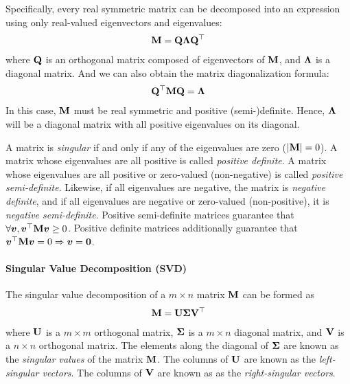 Specifically, every real symmetric matrix can be decomposed into an expression using only real-valued eigenvectors and eigenvalues:
\begin{align*}
	\mathbf{M}=\mathbf{Q}\mathbf{\Lambda}\mathbf{Q}{}^\top
\end{align*}
where $\mathbf{Q}$ is an orthogonal matrix composed of eigenvectors of $\mathbf{M}$, and $\mathbf{\Lambda}$ is a diagonal matrix. And we can also obtain the matrix diagonalization formula:
\begin{align*}
	\mathbf{Q}{}^\top\mathbf{M}\mathbf{Q}=\mathbf{\Lambda}
\end{align*}
In this case, $\mathbf{M}$ must be real symmetric and positive (semi-)definite. Hence, $\mathbf{\Lambda}$ will be a diagonal matrix with all positive eigenvalues on its diagonal.

A matrix is \emph{singular} if and only if any of the eigenvalues are zero ($\left\vert \mathbf{M} \right\vert=0$). A matrix whose eigenvalues are all positive is called \emph{positive definite}. A matrix whose eigenvalues are all positive or zero-valued (non-negative) is called \emph{positive semi-definite}. Likewise, if all eigenvalues are negative, the matrix is \emph{negative definite}, and if all eigenvalues are negative or zero-valued (non-positive), it is \emph{negative semi-definite}. Positive semi-definite matrices guarantee that $\forall\boldsymbol{v}, \boldsymbol{v}{}^\top\mathbf{M}\boldsymbol{v}\geq0$. Positive definite matrices additionally guarantee that $\boldsymbol{v}{}^\top\mathbf{M}\boldsymbol{v}=0\Rightarrow\boldsymbol{v}=\boldsymbol{0}$.

\paragraph{Singular Value Decomposition (SVD)}

The singular value decomposition of a $m\times n$ matrix $\mathbf{M}$ can be formed as
\begin{align*}
	\mathbf{M}=\mathbf{U}\mathbf{\Sigma}\mathbf{V}{}^\top
\end{align*}
where $\mathbf{U}$ is a $m\times m$ orthogonal matrix, $\mathbf{\Sigma}$ is a $m\times n$ diagonal matrix, and $\mathbf{V}$ is a $n\times n$ orthogonal matrix. The elements along the diagonal of $\mathbf{\Sigma}$ are known as the \emph{singular values} of the matrix $\mathbf{M}$. The columns of $\mathbf{U}$ are known as the \emph{left-singular vectors}. The columns of $\mathbf{V}$ are known as as the \emph{right-singular vectors}.

